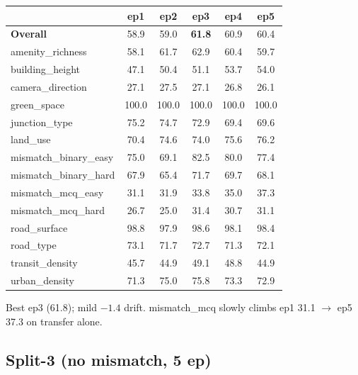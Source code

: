 \documentclass[11pt]{article}
\begin{document}
\begin{table}[h]\centering\scriptsize
\setlength{\tabcolsep}{6pt}
\begin{tabular}{l c c c c c}
\toprule
& ep1 & ep2 & ep3 & ep4 & ep5 \\
\midrule
\textbf{Overall}      & 58.9 & 59.0 & \textbf{61.8} & 60.9 & 60.4 \\
amenity\_richness     & 58.1 & 61.7 & 62.9 & 60.4 & 59.7 \\
building\_height      & 47.1 & 50.4 & 51.1 & 53.7 & 54.0 \\
camera\_direction     & 27.1 & 27.5 & 27.1 & 26.8 & 26.1 \\
green\_space          & 100.0 & 100.0 & 100.0 & 100.0 & 100.0 \\
junction\_type        & 75.2 & 74.7 & 72.9 & 69.4 & 69.6 \\
land\_use             & 70.4 & 74.6 & 74.0 & 75.6 & 76.2 \\
mismatch\_binary\_easy& 75.0 & 69.1 & 82.5 & 80.0 & 77.4 \\
mismatch\_binary\_hard& 67.9 & 65.4 & 71.7 & 69.7 & 68.1 \\
mismatch\_mcq\_easy   & 31.1 & 31.9 & 33.8 & 35.0 & 37.3 \\
mismatch\_mcq\_hard   & 26.7 & 25.0 & 31.4 & 30.7 & 31.1 \\
road\_surface         & 98.8 & 97.9 & 98.6 & 98.1 & 98.4 \\
road\_type            & 73.1 & 71.7 & 72.7 & 71.3 & 72.1 \\
transit\_density      & 45.7 & 44.9 & 49.1 & 48.8 & 44.9 \\
urban\_density        & 71.3 & 75.0 & 75.8 & 73.3 & 72.9 \\
\bottomrule
\end{tabular}
\end{table}

Best ep3 (61.8); mild $-1.4$ drift. mismatch\_mcq slowly climbs ep1 31.1 $\to$ ep5 37.3 on transfer alone.

\subsection*{Split-3 (no mismatch, 5 ep)}
\end{document}
